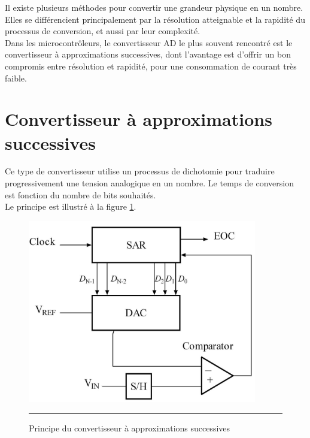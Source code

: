 Il existe plusieurs méthodes pour convertir une grandeur physique en un nombre. Elles se différencient principalement par la résolution atteignable et la rapidité du processus de conversion, et aussi par leur complexité.\\
Dans les microcontrôleurs, le convertisseur AD le plus souvent rencontré est le convertisseur à approximations successives, dont l'avantage est d'offrir un bon compromis entre résolution et rapidité, pour une consommation de courant très faible.

\section{Convertisseur à approximations successives}

Ce type de convertisseur utilise un processus de dichotomie pour traduire progressivement une tension analogique en un nombre. Le temps de conversion est fonction du nombre de bits souhaités.\\
Le principe est illustré à la figure \ref{fig:ADC_SAR_Diagram}.

\begin{figure}[htb]
  \centering
  \includegraphics [angle=0, width=10cm]{./Figures/Chap11_ADC/SA_ADC_block_diagram.png}
  \rule{35em}{0.5pt}
  \caption{Principe du convertisseur à approximations successives}
  \label{fig:ADC_SAR_Diagram}
\end{figure}

